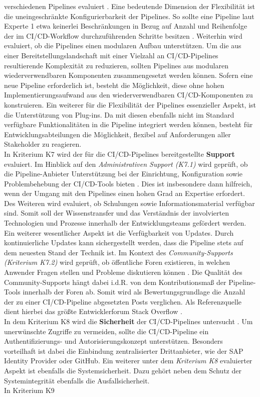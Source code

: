 verschiedenen Pipelines evaluiert \cite[Z. 70 ff.]{ProductOwnerSAPBTPProd&Infra.}. Eine bedeutende Dimension der Flexibilität ist die uneingeschränkte Konfigurierbarkeit der Pipelines. So sollte eine Pipeline laut Experte 1 etwa keinerlei Beschränkungen in Bezug auf Anzahl und Reihenfolge der im CI/CD-Workflow durchzuführenden Schritte besitzen \cite[Z. 70 ff.]{ProductOwnerSAPBTPProd&Infra.}. Weiterhin wird evaluiert, ob die Pipelines einen modularen Aufbau unterstützen. Um die aus einer Bereitstellungslandschaft mit einer Vielzahl an CI/CD-Pipelines resultierende Komplexität zu reduzieren, sollten Pipelines aus modularen wiederverwendbaren Komponenten zusammengesetzt werden können. Sofern eine neue Pipeline erforderlich ist, besteht die Möglichkeit, diese ohne hohen Implementierungsaufwand aus den wiederverwendbaren CI/CD-Komponenten zu konstruieren. Ein weiterer für die Flexibilität der Pipelines essenzieller Aspekt, ist die Unterstützung von Plug-ins. Da mit diesen ebenfalls nicht im Standard verfügbare Funktionalitäten in die Pipeline integriert werden können, besteht für Entwicklungsabteilungen die Möglichkeit, flexibel auf Anforderungen aller Stakeholder zu reagieren.\\ In Kriterium K7 wird der für die CI/CD-Pipelines bereitgestellte \textbf{Support} evaluiert. Im Hinblick auf den \textit{Administrativen Support (K7.1)} wird geprüft, ob die Pipeline-Anbieter Unterstützung bei der Einrichtung, Konfiguration sowie Problembehebung der CI/CD-Tools bieten \cite[Z. 44 ff.]{ProductManagerSAPHyperspaceCICD.}. Dies ist insbesondere dann hilfreich, wenn der Umgang mit den Pipelines einen hohen Grad an Expertise erfordert. Des Weiteren wird evaluiert, ob Schulungen sowie Informationsmaterial verfügbar sind. Somit soll der Wissenstransfer und das Verständnis der involvierten Technologien und Prozesse innerhalb der Entwicklungsteams gefördert werden. Ein weiterer wesentlicher Aspekt ist die Verfügbarkeit von Updates. Durch kontinuierliche Updates kann sichergestellt werden, dass die Pipeline stets auf dem neuesten Stand der Technik ist. Im Kontext des \textit{Community-Supports (Kriterium K7.2)} wird geprüft, ob öffentliche Foren existieren, in welchen Anwender Fragen stellen und Probleme diskutieren können \cite[Z. 46 ff.]{ProductManagerSAPHyperspaceCICD.}. Die Qualität des Community-Supports hängt dabei i.d.R. von dem Kontributionsmaß der Pipeline-Tools innerhalb der Foren ab. Somit wird als Bewertungsgrundlage die Anzahl der zu einer CI/CD-Pipeline abgesetzten Posts verglichen. Als Referenzquelle dient hierbei das größte Entwicklerforum Stack Overflow \cite{StackOverflow.20230403}.\\ In dem Kriterium K8 wird die \textbf{Sicherheit} der CI/CD-Pipelines untersucht \cite[Z. 79 ff.]{ProductOwnerSAPBTPProd&Infra.}. Um unerwünschte Zugriffe zu vermeiden, sollte die CI/CD-Pipeline ein Authentifizierungs- und Autorisierungskonzept unterstützen. Besonders vorteilhaft ist dabei die Einbindung zentralisierter Drittanbieter, wie der SAP Identity Provider oder GitHub. Ein weiterer unter dem \textit{Kriterium K8} evaluierter Aspekt ist ebenfalls die Systemsicherheit. Dazu gehört neben dem Schutz der Systemintegrität ebenfalls die Ausfallsicherheit.\\ In Kriterium K9 